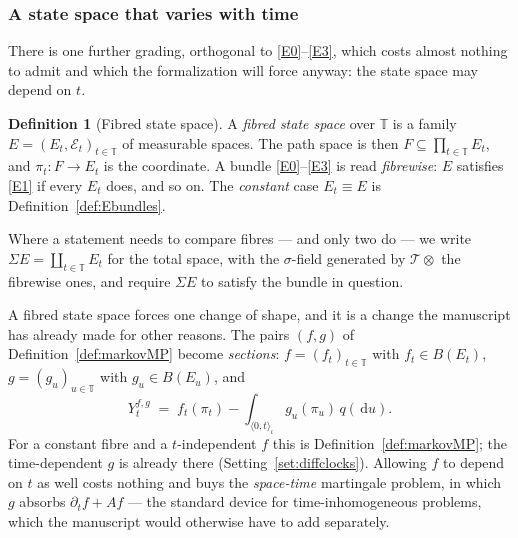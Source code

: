 \documentclass[11pt,a4paper]{article}
\theoremstyle{plain}
\theoremstyle{definition}
\newtheorem{definition}[theorem]{Definition}
\theoremstyle{remark}
\newcommand{\T}{\mathbb{T}}                     %
\newcommand{\Bdd}{B}                           %
\newcommand{\dif}{\,\mathrm{d}}
\begin{document}
\subsubsection*{A state space that varies with time}

There is one further grading, orthogonal to \eqref{E0}--\eqref{E3}, which costs almost
nothing to admit and which the formalization will force anyway: the state space
may depend on $t$.

\begin{definition}[Fibred state space]
  \label{def:Efibred}
  A \emph{fibred state space} over $\T$ is a family $E = (E_t,\mathcal{E}_t)_{t \in \T}$
  of measurable spaces.  The path space is then $F \subseteq \prod_{t \in \T} E_t$,
  and $\pi_t : F \to E_t$ is the coordinate.  A bundle \eqref{E0}--\eqref{E3} is read
  \emph{fibrewise}: $E$ satisfies \eqref{E1} if every $E_t$ does, and so on.  The
  \emph{constant} case $E_t \equiv E$ is Definition~\ref{def:Ebundles}.

  Where a statement needs to compare fibres --- and only two do --- we write
  $\Sigma E = \coprod_{t \in \T} E_t$ for the total space, with the
  $\sigma$-field generated by $\mathcal{T} \otimes$ the fibrewise ones, and
  require $\Sigma E$ to satisfy the bundle in question.
\end{definition}

A fibred state space forces one change of shape, and it is a change the
manuscript has already made for other reasons.  The pairs $(f,g)$ of
Definition~\ref{def:markovMP} become \emph{sections}: $f = (f_t)_{t\in\T}$ with
$f_t \in \Bdd(E_t)$, $g = (g_u)_{u\in\T}$ with $g_u \in \Bdd(E_u)$, and
\begin{equation}
  \label{eq:sectiontest}
  Y^{f,g}_t \;=\; f_t(\pi_t)
    - \int_{\langle 0,t\rangle_\iota} g_u(\pi_u) \, q(\dif u) .
\end{equation}
For a constant fibre and a $t$-independent $f$ this is
Definition~\ref{def:markovMP}; the time-dependent $g$ is already there
(Setting~\ref{set:diffclocks}).  Allowing $f$ to depend on $t$ as well costs
nothing and buys the \emph{space-time} martingale problem, in which $g$ absorbs
$\partial_t f + Af$ --- the standard device for time-inhomogeneous problems,
which the manuscript would otherwise have to add separately.
\end{document}
